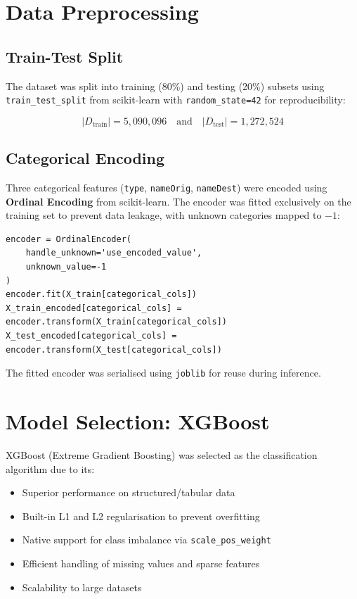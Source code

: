 \documentclass[12pt,a4paper]{report}
\begin{document}
\section{Data Preprocessing}

\subsection{Train-Test Split}

The dataset was split into training (80\%) and testing (20\%) subsets using \texttt{train\_test\_split} from scikit-learn with \texttt{random\_state=42} for reproducibility:

\begin{equation}
    |D_{\text{train}}| = 5{,}090{,}096 \quad \text{and} \quad |D_{\text{test}}| = 1{,}272{,}524
\end{equation}

\subsection{Categorical Encoding}

Three categorical features (\texttt{type}, \texttt{nameOrig}, \texttt{nameDest}) were encoded using \textbf{Ordinal Encoding} from scikit-learn. The encoder was fitted exclusively on the training set to prevent data leakage, with unknown categories mapped to $-1$:

\begin{lstlisting}[caption={Ordinal encoding implementation}]
encoder = OrdinalEncoder(
    handle_unknown='use_encoded_value',
    unknown_value=-1
)
encoder.fit(X_train[categorical_cols])
X_train_encoded[categorical_cols] = encoder.transform(X_train[categorical_cols])
X_test_encoded[categorical_cols] = encoder.transform(X_test[categorical_cols])
\end{lstlisting}

The fitted encoder was serialised using \texttt{joblib} for reuse during inference.

\section{Model Selection: XGBoost}

XGBoost (Extreme Gradient Boosting) was selected as the classification algorithm due to its:

\begin{itemize}
    \item Superior performance on structured/tabular data
    \item Built-in L1 and L2 regularisation to prevent overfitting
    \item Native support for class imbalance via \texttt{scale\_pos\_weight}
    \item Efficient handling of missing values and sparse features
    \item Scalability to large datasets
\end{itemize}
\end{document}
